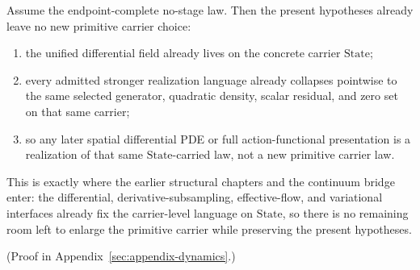 \begin{corollary}
\label{cor:endpoint-complete-no-stage-law-leaves-no-new-primitive-carrier-on-the-detached-flagship-surface}
Assume the endpoint-complete no-stage law. Then the present hypotheses already
leave no new primitive carrier choice:
\begin{enumerate}[label=(\roman*), leftmargin=2em, itemsep=0.2em]
\item the unified differential field already lives on the concrete carrier
      \(\mathrm{State}\);
\item every admitted stronger realization language already collapses pointwise
      to the same selected generator, quadratic density, scalar residual, and
      zero set on that same carrier;
\item so any later spatial differential PDE or full action-functional
      presentation is a realization of that same \(\mathrm{State}\)-carried
      law, not a new primitive carrier law.
\end{enumerate}
This is exactly where the earlier structural chapters and the
continuum bridge enter: the differential,
derivative-subsampling, effective-flow, and variational interfaces already fix
the carrier-level language on \(\mathrm{State}\), so there is no remaining room
left to enlarge the primitive carrier while preserving the present hypotheses.
\end{corollary}

(Proof in Appendix~\ref{sec:appendix-dynamics}.)

